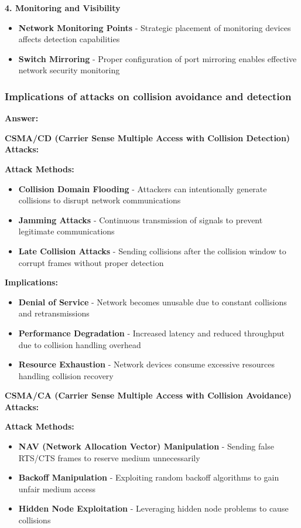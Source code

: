 \documentclass[12pt,a4paper]{article}
\begin{document}
\textbf{4. Monitoring and Visibility}
\begin{itemize}
    \item \textbf{Network Monitoring Points} - Strategic placement of monitoring devices affects detection capabilities
    \item \textbf{Switch Mirroring} - Proper configuration of port mirroring enables effective network security monitoring
\end{itemize}

\subsubsection{Implications of attacks on collision avoidance and detection}

\textbf{Answer:}

\textbf{CSMA/CD (Carrier Sense Multiple Access with Collision Detection) Attacks:}

\textbf{Attack Methods:}
\begin{itemize}
    \item \textbf{Collision Domain Flooding} - Attackers can intentionally generate collisions to disrupt network communications
    \item \textbf{Jamming Attacks} - Continuous transmission of signals to prevent legitimate communications
    \item \textbf{Late Collision Attacks} - Sending collisions after the collision window to corrupt frames without proper detection
\end{itemize}

\textbf{Implications:}
\begin{itemize}
    \item \textbf{Denial of Service} - Network becomes unusable due to constant collisions and retransmissions
    \item \textbf{Performance Degradation} - Increased latency and reduced throughput due to collision handling overhead
    \item \textbf{Resource Exhaustion} - Network devices consume excessive resources handling collision recovery
\end{itemize}

\textbf{CSMA/CA (Carrier Sense Multiple Access with Collision Avoidance) Attacks:}

\textbf{Attack Methods:}
\begin{itemize}
    \item \textbf{NAV (Network Allocation Vector) Manipulation} - Sending false RTS/CTS frames to reserve medium unnecessarily
    \item \textbf{Backoff Manipulation} - Exploiting random backoff algorithms to gain unfair medium access
    \item \textbf{Hidden Node Exploitation} - Leveraging hidden node problems to cause collisions
\end{itemize}
\end{document}
